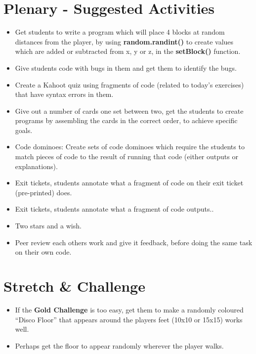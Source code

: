 \documentclass{geocraft-lesson-plan}
\begin{document}
\section*{Plenary - Suggested Activities}
\begin{itemize}
\item Get students to write a program which will place 4 blocks at random distances from the player, by using
  \textbf{random.randint()} to create values which are added or subtracted from x, y or z, in the \textbf{setBlock()}
  function. 
\item Give students code with bugs in them and get them to identify the bugs.
\item Create a Kahoot quiz using fragments of code (related to today's exercises) that have syntax errors in them.
\item Give out a number of cards one set between two, get the students to create programs by assembling the cards in the
  correct order, to achieve specific goals.
\item Code dominoes: Create sets of code dominoes which require the students to match pieces of code to the result of
  running that code (either outputs or explanations).
\item Exit tickets, students annotate what a fragment of code on their exit ticket (pre-printed) does.
\item Exit tickets, students annotate what a fragment of code outputs..
\item Two stars and a wish.
\item Peer review each others work and give it feedback, before doing the same task on their own code.
\end{itemize}

\section*{Stretch \& Challenge}
\begin{itemize}
\item If the \textbf{Gold Challenge} is too easy, get them to make a randomly coloured ``Disco Floor'' that appears
  around the players feet (10x10 or 15x15) works well.
\item Perhaps get the floor to appear randomly wherever the player walks.
\end{itemize}
\end{document}
